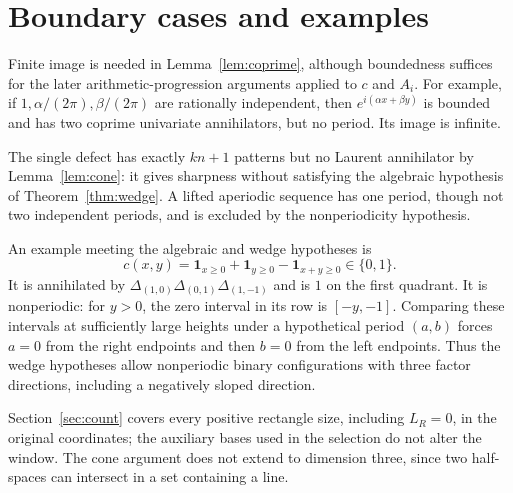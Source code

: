 \documentclass[11pt]{article}
\numberwithin{equation}{section}
\theoremstyle{definition}
\theoremstyle{remark}
\newcommand{\Del}[1]{\Delta_{#1}}
\begin{document}
\section{Boundary cases and examples}\label{app:examples}
Finite image is needed in Lemma~\ref{lem:coprime}, although boundedness suffices for the later
arithmetic-progression arguments applied to $c$ and $A_i$. For example, if
$1,\alpha/(2\pi),\beta/(2\pi)$ are rationally independent, then $e^{i(\alpha x+\beta y)}$ is bounded
and has two coprime univariate annihilators, but no period. Its image is infinite.

The single defect has exactly $kn+1$ patterns but no Laurent annihilator by Lemma~\ref{lem:cone}:
it gives sharpness without satisfying the algebraic hypothesis of Theorem~\ref{thm:wedge}. A lifted
aperiodic sequence has one period, though not two independent periods, and is excluded by the
nonperiodicity hypothesis.

An example meeting the algebraic and wedge hypotheses is
\[
 c(x,y)=\mathbf1_{x\ge0}+\mathbf1_{y\ge0}-\mathbf1_{x+y\ge0}\in\{0,1\}.
\]
It is annihilated by $\Del{(1,0)}\Del{(0,1)}\Del{(1,-1)}$ and is $1$ on the first quadrant. It is
nonperiodic: for $y>0$, the zero interval in its row is $[-y,-1]$. Comparing these intervals at
sufficiently large heights under a hypothetical period $(a,b)$ forces $a=0$ from the right endpoints
and then $b=0$ from the left endpoints. Thus the wedge hypotheses allow nonperiodic binary
configurations with three factor directions, including a negatively sloped direction.

Section~\ref{sec:count} covers every positive rectangle size, including $L_R=0$, in the original
coordinates; the auxiliary bases used in the selection do not alter the window. The cone argument does not extend to dimension three, since two half-spaces can intersect in a set containing a line.
\end{document}
